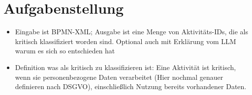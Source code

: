 \section{Aufgabenstellung}\label{sec:aufgabenstellung}

\begin{itemize}
    \item Eingabe ist BPMN-XML; Ausgabe ist eine Menge von Aktivitäts-IDs, die als kritisch klassifiziert worden sind. Optional auch mit Erklärung vom LLM warum es sich so entschieden hat
    \item Definition was als kritisch zu klassifizieren ist: Eine Aktivität ist kritisch, wenn sie personenbezogene Daten verarbeitet (Hier nochmal genauer definieren nach DSGVO), einschließlich Nutzung bereits vorhandener Daten.
\end{itemize}